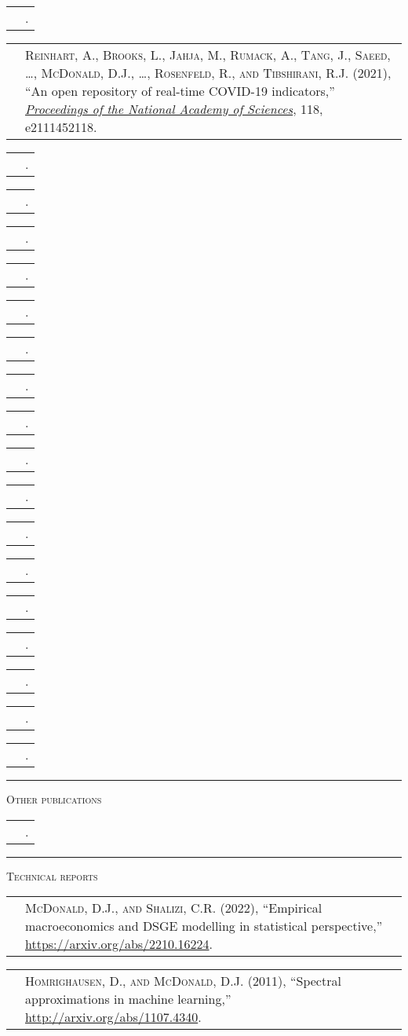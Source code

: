 \documentclass[11pt,letterpaper]{minimal/moderncv}
\makeatletter
\newcommand{\cvbibentry}[2]{\cvitem{#2}{\leavevmode\nobreak\bibentry{#1}.\vspace*{6pt}}}
\renewcommand{\section}[1]{  \par\addvspace{15pt}%
  \parbox[t]{\hintscolumnwidth}{\strut\raggedleft\raisebox{4pt}%
  {\rule{\hintscolumnwidth}{2pt}}}%
  \hspace{\separatorcolumnwidth}%
  \textsc{\Large #1}\par\nobreak\addvspace{6pt}%
}
\renewcommand*{\cvitem}[2]{%
  \begin{tabular}{@{}p{\hintscolumnwidth}@{\hspace{\separatorcolumnwidth}}%
    p{\maincolumnwidth}@{}}%
    \raggedleft {#1} &  {#2}%
  \end{tabular}%
}
\makeatother
\begin{document}
\cvbibentry{McDonaldBien2021}{2021}
\cvitem{}{{\scshape Reinhart, A., Brooks, L., Jahja, M., Rumack, A., Tang, J.,
  Saeed, \ldots, McDonald, D.J., \ldots, Rosenfeld, R., and Tibshirani, R.J.}
  (2021), ``An open repository of real-time {COVID-19} indicators,''
  \href{https://doi.org/10.1073/pnas.2111452118}{\em Proceedings of the National
  Academy of Sciences}, 118, e2111452118.\vspace*{6pt}}
  \cvbibentry{PolicastroMcDonald2020}{}
  \cvbibentry{McDonald2016}{}


\cvbibentry{HomrighausenMcDonald2017}{2020}

\cvbibentry{KhodadadiMcDonald2018}{2019}

\cvbibentry{HomrighausenMcDonald2015a}{2018}

\cvbibentry{DingMcDonald2017}{2017}
\cvbibentry{McDonald2017}{}
\cvbibentry{McDonaldShalizi2016}{}
\cvbibentry{HomrighausenMcDonald2015}{}

\cvbibentry{HomrighausenMcDonald2016}{2016}

\cvbibentry{McDonaldShalizi2015}{2015}
\cvbibentry{LoewensteinKrishnamurti2015}{}

\cvbibentry{HomrighausenMcDonald2014}{2014}

\cvbibentry{HomrighausenMcDonald2013}{2013}

\cvbibentry{JuePress2012}{2012}

\cvbibentry{McDonaldShalizi2011a}{2011}

\cvbibentry{McDonaldThornton2008}{2008}

\section{Other publications}

\cvbibentry{McDonald2020}{2020}


\section{Technical reports}

\cvitem{}{{\scshape McDonald, D.J., and Shalizi, C.R.} (2022), ``Empirical
macroeconomics and DSGE modelling in statistical perspective,''
\url{https://arxiv.org/abs/2210.16224}.\vspace*{6pt}}

\cvitem{}{{\scshape Homrighausen, D., and McDonald, D.J.} (2011), ``Spectral
approximations in machine learning,''
\url{http://arxiv.org/abs/1107.4340}.\vspace*{6pt}}
\end{document}
